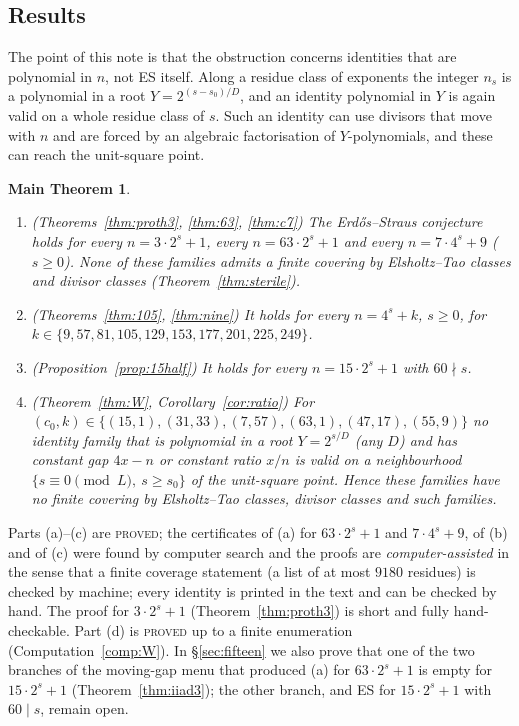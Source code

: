 \documentclass[11pt,reqno]{amsart}
\newtheorem*{mainthm}{Main Theorem}
\theoremstyle{definition}
\newcommand{\status}[1]{\textup{\textsc{#1}}}
\begin{document}
\subsection*{Results}
The point of this note is that the obstruction concerns identities that
are polynomial in $n$, not ES itself.  Along a residue class of exponents
the integer $n_s$ is a polynomial in a root $Y=2^{(s-s_0)/D}$, and an
identity polynomial in $Y$ is again valid on a whole residue class of $s$.
Such an identity can use divisors that move with $n$ and are forced by an
algebraic factorisation of $Y$-polynomials, and these can reach the
unit-square point.

\begin{mainthm}
\begin{enumerate}
\item[(a)] \textup{(Theorems~\ref{thm:proth3}, \ref{thm:63}, \ref{thm:c7})}
The Erd\H{o}s--Straus conjecture holds for every $n=3\cdot2^s+1$, every
$n=63\cdot2^s+1$ and every $n=7\cdot4^s+9$ ($s\ge0$).  None of these
families admits a finite covering by Elsholtz--Tao classes and divisor
classes (Theorem~\ref{thm:sterile}).
\item[(b)] \textup{(Theorems~\ref{thm:105}, \ref{thm:nine})} It holds for
every $n=4^s+k$, $s\ge0$, for $k\in\{9,57,81,105,129,\allowbreak
153,177,201,225,249\}$.
\item[(c)] \textup{(Proposition~\ref{prop:15half})} It holds for every
$n=15\cdot2^s+1$ with $60\nmid s$.
\item[(d)] \textup{(Theorem~\ref{thm:W}, Corollary~\ref{cor:ratio})} For
$(c_0,k)\in\{(15,1),(31,33),(7,57),(63,1),(47,17),(55,9)\}$ no identity
family that is polynomial in a root $Y=2^{s/D}$ (any $D$) and has constant
gap $4x-n$ or constant ratio $x/n$ is valid on a neighbourhood
$\{s\equiv0\pmod L,\ s\ge s_0\}$ of the unit-square point.  Hence
these families have no finite covering by Elsholtz--Tao classes, divisor
classes and such families.
\end{enumerate}
\end{mainthm}

Parts (a)--(c) are \status{proved}; the certificates of (a) for
$63\cdot2^s+1$ and $7\cdot4^s+9$, of (b) and of (c) were found by computer
search and the proofs are \emph{computer-assisted} in the sense that a
finite coverage statement (a list of at most $9180$ residues) is checked by
machine; every identity is printed in the text and can be checked by hand.
The proof for $3\cdot2^s+1$ (Theorem~\ref{thm:proth3}) is short and fully
hand-checkable.  Part (d) is \status{proved} up to a finite enumeration
(Computation~\ref{comp:W}).  In \S\ref{sec:fifteen} we also prove that one of
the two branches of the moving-gap menu that produced (a) for
$63\cdot2^s+1$ is empty for $15\cdot2^s+1$ (Theorem~\ref{thm:iiad3}); the
other branch, and ES for $15\cdot2^s+1$ with $60\mid s$, remain open.
\end{document}
